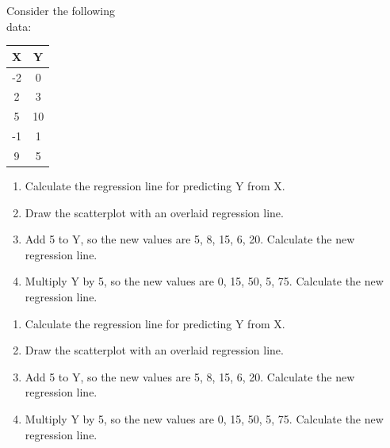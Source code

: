 \documentclass[11pt, chapterprefix=true]{scrbook}\usepackage[]{graphicx}\usepackage[]{color}
\begin{document}
\begin{exercises}
\begin{exercise}  %

Consider the following \\ data:

\begin{tabular}{@{} cc @{}} \hline
X & Y \\ \hline
-2 & 0 \\
2 & 3 \\
5 & 10 \\
-1 & 1 \\
9 & 5 \\ \hline
\end{tabular}

\begin{enumerate}
  \item Calculate the regression line for predicting Y from X.
  \item Draw the scatterplot with an overlaid regression line.
  \item Add 5 to Y, so the new values are 5, 8, 15, 6, 20.  Calculate the new regression line.                                         
  \item Multiply Y by 5, so the new values are 0, 15, 50, 5, 75.  Calculate the new regression line.                                         
\end{enumerate}


\end{exercise}
\begin{solution} %

\begin{enumerate}
  \item Calculate the regression line for predicting Y from X.
  \item Draw the scatterplot with an overlaid regression line.
  \item Add 5 to Y, so the new values are 5, 8, 15, 6, 20.  Calculate the new regression line.                                         
  \item Multiply Y by 5, so the new values are 0, 15, 50, 5, 75.  Calculate the new regression line.                                         
\end{enumerate}

\end{solution}

\begin{exercise} %


\end{exercise}
\end{exercises}
\end{document}
